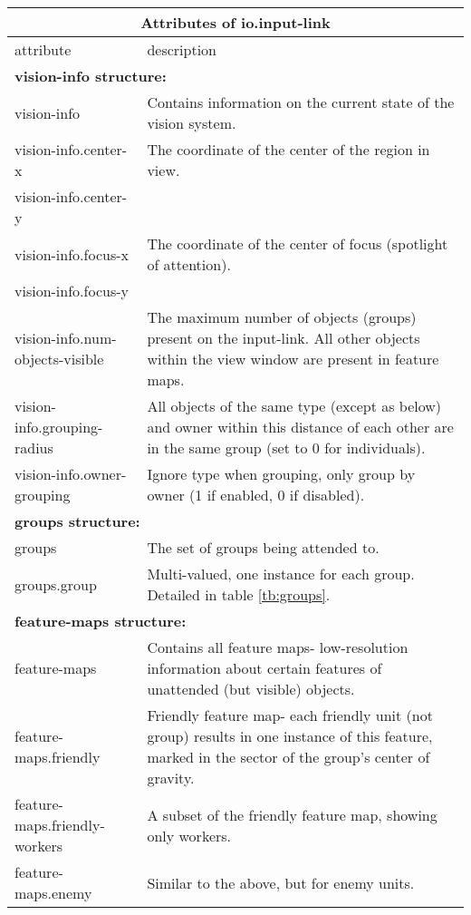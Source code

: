 \begin{center}
\begin{table}
\begin{tabular}{|l|p{4.0in}|}
\hline
\multicolumn{2}{|c|}{\textbf{Attributes of io.input-link}}\\ 
\hline
attribute  &  description\\
\hline \hline
\multicolumn{2}{|l|}{\textbf{vision-info structure:}}\\ 
\hline
vision-info & Contains information on the current state of the vision system. \\
\hline
vision-info.center-x & The coordinate of the center of the region in view. \\
vision-info.center-y & \\
\hline
vision-info.focus-x & The coordinate of the center of focus (spotlight of attention). \\
vision-info.focus-y & \\
\hline
vision-info.num-objects-visible & The maximum number of objects (groups) present on the input-link. All other objects within the view window are present in feature maps. \\
\hline
vision-info.grouping-radius & All objects of the same type (except as below) and owner within this distance of each other are in the same group (set to 0 for individuals). \\
\hline
vision-info.owner-grouping & Ignore type when grouping, only group by owner (1 if enabled, 0 if disabled). \\
\hline
\multicolumn{2}{|l|}{\textbf{groups structure:}}\\ 
\hline
groups & The set of groups being attended to. \\
\hline
groups.group & Multi-valued, one instance for each group. Detailed in table \ref{tb:groups}. \\
\hline
\multicolumn{2}{|l|}{\textbf{feature-maps structure:}}\\ 
\hline
feature-maps & Contains all feature maps- low-resolution information about certain features of unattended (but visible) objects. \\
\hline
feature-maps.friendly & Friendly feature map- each friendly unit (not group) results in one instance of this feature, marked in the sector of the group's center of gravity. \\
\hline
feature-maps.friendly-workers & A subset of the friendly feature map, showing only workers.\\
\hline
feature-maps.enemy & Similar to the above, but for enemy units.\\

\end{tabular}
\end{table}
\end{center}
